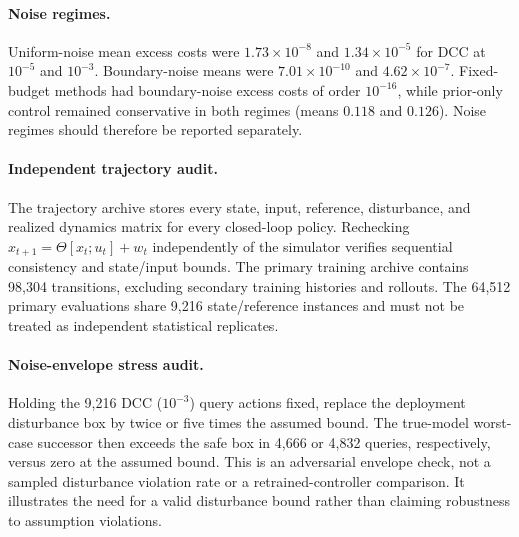 \paragraph{Noise regimes.}
Uniform-noise mean excess costs were $1.73\times10^{-8}$ and $1.34\times10^{-5}$ for DCC at $10^{-5}$ and $10^{-3}$. Boundary-noise means were $7.01\times10^{-10}$ and $4.62\times10^{-7}$. Fixed-budget methods had boundary-noise excess costs of order $10^{-16}$, while prior-only control remained conservative in both regimes (means $0.118$ and $0.126$). Noise regimes should therefore be reported separately.

\paragraph{Independent trajectory audit.}
The trajectory archive stores every state, input, reference, disturbance, and realized dynamics matrix for every closed-loop policy. Rechecking $x_{t+1}=\Theta[x_t;u_t]+w_t$ independently of the simulator verifies sequential consistency and state/input bounds. The primary training archive contains 98,304 transitions, excluding secondary training histories and rollouts. The 64,512 primary evaluations share 9,216 state/reference instances and must not be treated as independent statistical replicates.

\paragraph{Noise-envelope stress audit.}
Holding the 9,216 DCC ($10^{-3}$) query actions fixed, replace the deployment disturbance box by twice or five times the assumed bound. The true-model worst-case successor then exceeds the safe box in 4,666 or 4,832 queries, respectively, versus zero at the assumed bound. This is an adversarial envelope check, not a sampled disturbance violation rate or a retrained-controller comparison. It illustrates the need for a valid disturbance bound rather than claiming robustness to assumption violations.
